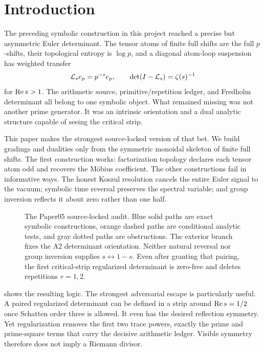 \section{Introduction}

The preceding symbolic construction in this project reached a precise but
asymmetric Euler determinant. The tensor atoms of finite full shifts are the
full $p$-shifts, their topological entropy is $\log p$, and a diagonal
atom-loop suspension has weighted transfer
\[
  \mathcal L_s e_p=p^{-s}e_p,\qquad
  \det(I-\mathcal L_s)=\zeta(s)^{-1}
\]
for $\operatorname{Re} s>1$. The arithmetic source, primitive/repetition ledger, and
Fredholm determinant all belong to one symbolic object. What remained
missing was not another prime generator. It was an intrinsic orientation and
a dual analytic structure capable of seeing the critical strip.

This paper makes the strongest source-locked version of that bet. We build
gradings and dualities only from the symmetric monoidal skeleton of finite
full shifts. The first construction works: factorization topology declares
each tensor atom odd and recovers the M\"obius coefficient. The other
constructions fail in informative ways. The honest Koszul resolution cancels
the entire Euler signal to the vacuum; symbolic time reversal preserves the
spectral variable; and group inversion reflects it about zero rather than
one half.

\begin{figure}[t]
  \centering
  
  \caption{The Paper05 source-locked audit. Blue solid paths are exact
  symbolic constructions, orange dashed paths are conditional analytic
  tests, and gray dotted paths are obstructions. The exterior branch fixes
  the A2 determinant orientation. Neither natural reversal nor group
  inversion supplies $s\leftrightarrow1-s$. Even after granting that pairing,
  the first critical-strip regularized determinant is zero-free and deletes
  repetitions $r=1,2$.}
  \label{fig:grading-duality}
\end{figure}

 shows the resulting logic. The strongest
adversarial escape is particularly useful. A paired regularized determinant
can be defined in a strip around $\operatorname{Re} s=1/2$ once Schatten order three is
allowed. It even has the desired reflection symmetry. Yet regularization
removes the first two trace powers, exactly the prime and prime-square terms
that carry the decisive arithmetic ledger. Visible symmetry therefore does
not imply a Riemann divisor.

